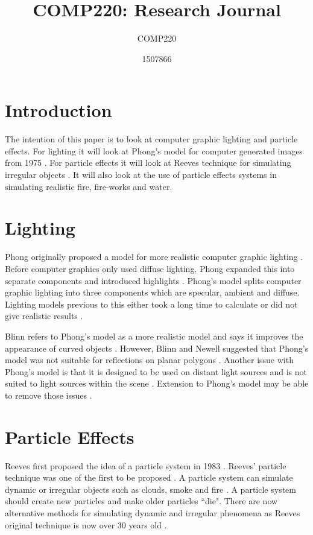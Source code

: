 \documentclass{scrartcl}
\title{COMP220: Research Journal}
\subtitle{COMP220}
\author{1507866}
\begin{document}
	
\maketitle
{}
	
\section{Introduction}
The intention of this paper is to look at computer graphic lighting and particle effects. For lighting it will look at Phong's model for computer generated images from 1975 \cite{Phong}.  For particle effects it will look at Reeves technique for simulating irregular objects \cite{Reeves}.
It will also look at the use of particle effects systems in simulating realistic fire, fire-works and water.  

\section{Lighting}
Phong originally proposed a model for more realistic computer graphic lighting \cite{Phong}. 
Before computer graphics only used diffuse lighting.  Phong expanded this into separate components and introduced highlights \cite{Kajiya, BlinnNewell, Phong}.  Phong's model splits computer graphic lighting into three components which are specular, ambient and diffuse.  Lighting models previous to this either took a long time to calculate or did not give realistic results \cite{Phong}.

Blinn refers to Phong's model as a more realistic model and says it improves the appearance of curved objects \cite{Blinn}.  However, Blinn and Newell suggested that Phong's model was not suitable for reflections on planar polygons \cite{BlinnNewell}.   Another issue with Phong's model is that it is designed to be used on distant light sources and is not suited to light sources within the scene \cite{Whitted}.   Extension to Phong's model may be able to remove those issues \cite{BlinnNewell, Whitted}.

	
\section{Particle Effects}
Reeves first proposed the idea of a particle system in 1983 \cite{Reeves}.  Reeves' particle technique was one of the first to be proposed \cite{Pegoraro}.  
A particle system can simulate dynamic or irregular objects such as clouds, smoke and fire \cite{Reeves, Lei, Nishita}.  A particle system should create new particles and make older particles ``die". 
There are now alternative methods for simulating dynamic and irregular phenomena as Reeves original technique is now over 30 years old  \cite{Nishita, Pegoraro}.
\end{document}
